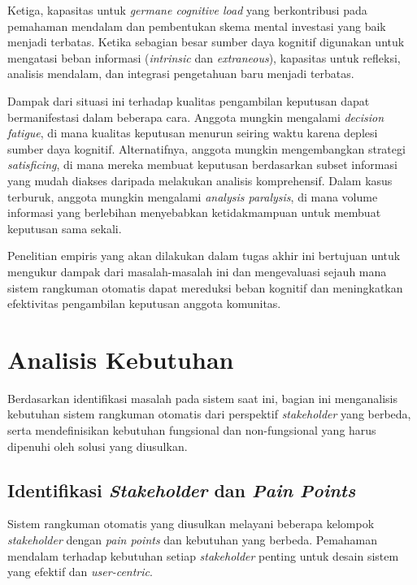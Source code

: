 Ketiga, kapasitas untuk \textit{germane cognitive load} yang berkontribusi pada pemahaman mendalam dan pembentukan skema mental investasi yang baik menjadi terbatas. Ketika sebagian besar sumber daya kognitif digunakan untuk mengatasi beban informasi (\textit{intrinsic} dan \textit{extraneous}), kapasitas untuk refleksi, analisis mendalam, dan integrasi pengetahuan baru menjadi terbatas.

Dampak dari situasi ini terhadap kualitas pengambilan keputusan dapat bermanifestasi dalam beberapa cara. Anggota mungkin mengalami \textit{decision fatigue}, di mana kualitas keputusan menurun seiring waktu karena deplesi sumber daya kognitif. Alternatifnya, anggota mungkin mengembangkan strategi \textit{satisficing}, di mana mereka membuat keputusan berdasarkan subset informasi yang mudah diakses daripada melakukan analisis komprehensif. Dalam kasus terburuk, anggota mungkin mengalami \textit{analysis paralysis}, di mana volume informasi yang berlebihan menyebabkan ketidakmampuan untuk membuat keputusan sama sekali.

Penelitian empiris yang akan dilakukan dalam tugas akhir ini bertujuan untuk mengukur dampak dari masalah-masalah ini dan mengevaluasi sejauh mana sistem rangkuman otomatis dapat mereduksi beban kognitif dan meningkatkan efektivitas pengambilan keputusan anggota komunitas.

\section{Analisis Kebutuhan}
\label{sec:analisis-kebutuhan}

Berdasarkan identifikasi masalah pada sistem saat ini, bagian ini menganalisis kebutuhan sistem rangkuman otomatis dari perspektif \textit{stakeholder} yang berbeda, serta mendefinisikan kebutuhan fungsional dan non-fungsional yang harus dipenuhi oleh solusi yang diusulkan.

\subsection{Identifikasi \textit{Stakeholder} dan \textit{Pain Points}}

Sistem rangkuman otomatis yang diusulkan melayani beberapa kelompok \textit{stakeholder} dengan \textit{pain points} dan kebutuhan yang berbeda. Pemahaman mendalam terhadap kebutuhan setiap \textit{stakeholder} penting untuk desain sistem yang efektif dan \textit{user-centric}.

